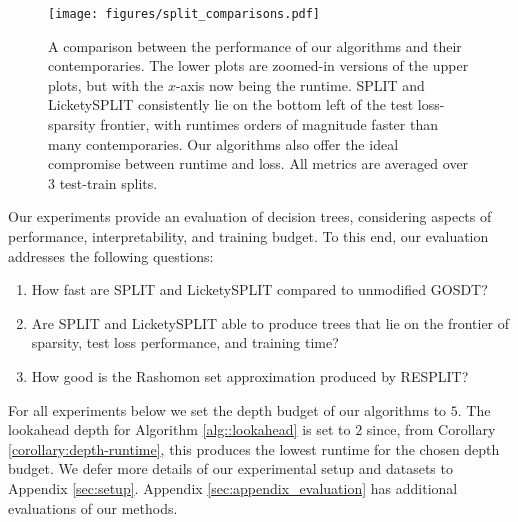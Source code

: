 
\begin{figure*}[htbp]
    \centering
        \centering
        \texttt{[image: figures/split\_comparisons.pdf]}
        \caption{A comparison between the performance of our algorithms and their contemporaries. The lower plots are zoomed-in versions of the upper plots, but with the $x$-axis now being the runtime. SPLIT and LicketySPLIT consistently lie on the bottom left of the test loss-sparsity frontier, with runtimes orders of magnitude faster than many contemporaries. Our algorithms also offer the ideal compromise between runtime and loss. All metrics are averaged over $3$ test-train splits.}
        \label{fig:split_comparisons}

    \label{fig:comparisons}
\end{figure*}

Our experiments provide an evaluation of decision trees, considering aspects of performance, interpretability, and training budget. To this end, our evaluation addresses the following questions:
\begin{enumerate}
    \item How fast are SPLIT and LicketySPLIT compared to unmodified GOSDT?
    \item Are SPLIT and LicketySPLIT able to produce trees that lie on the frontier of sparsity, test loss performance, and training time?
    \item How good is the Rashomon set approximation produced by RESPLIT?
\end{enumerate}
For all experiments below we set the depth budget of our algorithms to $5$. The lookahead depth for Algorithm \ref{alg::lookahead} is set to $2$ since, from Corollary \ref{corollary:depth-runtime}, this produces the lowest runtime for the chosen depth budget. We defer more details of our experimental setup and datasets to Appendix \ref{sec:setup}. Appendix \ref{sec:appendix_evaluation} has additional evaluations of our methods. 
